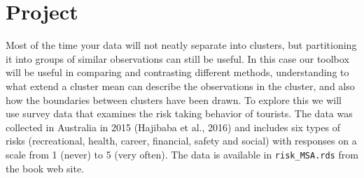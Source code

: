 \documentclass[
  letterpaper,
]{krantz}
\begin{document}
\section*{Project}\label{project-1}


Most of the time your data will not neatly separate into clusters, but
partitioning it into groups of similar observations can still be useful.
In this case our toolbox will be useful in comparing and contrasting
different methods, understanding to what extend a cluster mean can
describe the observations in the cluster, and also how the boundaries
between clusters have been drawn. To explore this we will use survey
data that examines the risk taking behavior of tourists. The data was
collected in Australia in 2015 (Hajibaba et al., 2016) and includes six
types of risks (recreational, health, career, financial, safety and
social) with responses on a scale from 1 (never) to 5 (very often). The
data is available in \texttt{risk\_MSA.rds} from the book web site.
\end{document}
